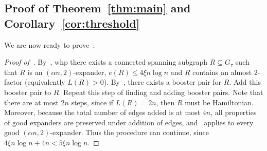 \documentclass[reqno,final,a4paper]{amsart}
\numberwithin{equation}{section}
\theoremstyle{definition}
\theoremstyle{remark}
\begin{document}
\subsection{Proof of Theorem~\ref{thm:main} and Corollary~\ref{cor:threshold}}
We are now ready to prove~:
\begin{proof}[Proof of~]
    By~, whp there exists a connected spanning subgraph $R\subseteq G_\tau$ such that $R$ is an $(\alpha n,2)$-expander, $e(R)\leq 4\xi n\log n$ and $R$ contains an almost $2$-factor (equivalently $L(R) > 0$). 
    By~, there exists a booster pair for $R$. 
    Add this booster pair to $R$. Repeat this step of finding and adding booster pairs.
    Note that there are at most $2n$ steps, since if $L(R) = 2n$, then $R$ must be Hamiltonian. Moreover, because the total number of edges added is at most $4n$, all properties of good expanders are preserved under addition of edges, and~ applies to every good $(\alpha n,2)$-expander. Thus the procedure can continue, since $4\xi n\log n + 4n< 5\xi n\log n$.
\end{proof}
\end{document}
